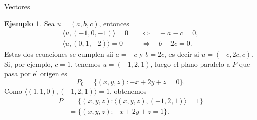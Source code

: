 \documentclass[a4paper,12pt,twoside,spanish,reqno]{amsbook}
\theoremstyle{definition}
\newtheorem{ejemplo}{Ejemplo}[section]
\theoremstyle{remark}
\newcommand{\la}{\langle}
\newcommand{\ra}{\rangle}
\begin{document}
\begin{chapter}{Vectores}
\begin{ejemplo}
		 Sea $u= (a,b,c)$,  entonces 
		\begin{align*}
			\la u,(-1,0,-1) \ra = 0 \quad &\Leftrightarrow \quad -a -c=0, \\
			\la u,(0,1,-2) \ra = 0 \quad &\Leftrightarrow \quad b -2c=0.
		\end{align*} 
		Estas dos ecuaciones se cumplen sii $a = -c$ y $b=2c$, es decir si $u=(-c,2c,c)$. Si, por ejemplo, $c=1$, tenemos $u=(-1,2,1)$, luego el plano paralelo a $P$  que pasa por el origen es
		\begin{equation*}
		P_0 = \{(x,y,z): -x+2y+z =0\}. 
		\end{equation*}
		Como $\la (1,1,0),(-1,2,1) \ra = 1 $, obtenemos
		\begin{align*}
		P &= \{(x,y,z): \la (x,y,z),(-1,2,1) \ra =1\} \\
		&= \{(x,y,z): -x+2y+z =1\}.
		\end{align*}
		    
		
	\end{ejemplo}

	\end{chapter}
\end{document}
